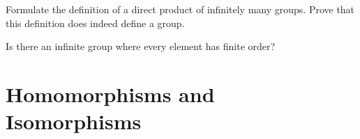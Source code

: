 \documentclass[./algebra-notes.tex]{subfiles}
\begin{document}
\begin{exercise}
    Formulate the definition of a direct product of infinitely many groups.
    Prove that this definition does indeed define a group.
\end{exercise}

\begin{exercise}
    Is there an infinite group where every element has finite order?
\end{exercise}

\section{Homomorphisms and Isomorphisms}

\end{document}
